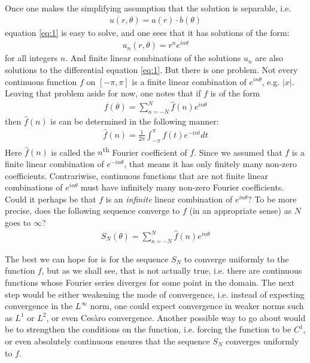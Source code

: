 \documentclass[12pt, titlepage]{article}
\theoremstyle{definition}
\begin{document}
Once one makes the simplifying assumption that the solution is separable, i.e.
\begin{align*}
    u(r, \theta) = a(r) \cdot b(\theta)
\end{align*}
equation \ref{eq:1} is easy to solve, and one sees that it has solutions of the form:
\begin{align*}
    u_n(r, \theta) = r^n e^{in\theta}
\end{align*}
for all integers $n$. And finite linear combinations of the solutions $u_n$ are also solutions to the differential equation \ref{eq:1}. But there is one problem. Not every continuous function $f$ on $[-\pi, \pi]$ is a finite linear combination of $e^{in\theta}$, e.g. $|x|$. Leaving that problem aside for now, one notes that if $f$ is of the form
\begin{align*}
    f(\theta) = \sum_{n = -N}^{N} \widehat{f}(n) e^{in\theta}
\end{align*}
then $\widehat{f}(n)$ is can be determined in the following manner:
\begin{align}
    \widehat{f}(n) = \frac{1}{2\pi} \int_{-\pi}^{\pi} f(t) e^{-int} dt \label{eq:2}
\end{align}
Here $\widehat{f}(n)$ is called the $n$\textsuperscript{th} Fourier coefficient of $f$. Since we assumed that $f$ is a finite linear combination of $e^{-in\theta}$, that means it has only finitely many non-zero coefficients. Contrariwise, continuous functions that are not finite linear combinations of $e^{in\theta}$ must have infinitely many non-zero Fourier coefficients. Could it perhaps be that $f$ is an \emph{infinite} linear combination of $e^{in\theta}$? To be more precise, does the following sequence converge to $f$ (in an appropriate sense) as $N$ goes to $\infty$?
\begin{align*}
    S_N(\theta) = \sum_{n = -N}^{N} \widehat{f}(n) e^{in\theta}
\end{align*}

The best we can hope for is for the sequence $S_N$ to converge uniformly to the function $f$, but as we shall see, that is not actually true, i.e. there are continuous functions whose Fourier series diverges for some point in the domain. The next step would be either weakening the mode of convergence, i.e. instead of expecting convergence in the $L^{\infty}$ norm, one could expect convergence in weaker norms such as $L^1$ or $L^2$, or even Cesàro convergence. Another possible way to go about would be to strengthen the conditions on the function, i.e. forcing the function to be $C^1$, or even absolutely continuous ensures that the sequence $S_N$ converges uniformly to $f$.
\end{document}
